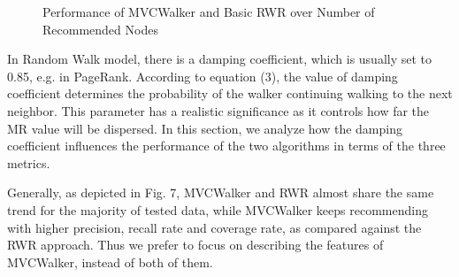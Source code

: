 \documentclass[10pt,journal,compsoc]{IEEEtran}
\begin{document}
\begin{figure}
\centering
{}
\caption{Performance of MVCWalker and Basic RWR over Number of Recommended Nodes}
\label{fig:8}       %
\end{figure}
In Random Walk model, there is a damping coefficient, which is usually set to 0.85, e.g. in PageRank. According to equation (3), the value of damping coefficient determines the probability of the walker continuing walking to the next neighbor. This parameter has a realistic significance as it controls how far the MR value will be dispersed. In this section, we analyze how the damping coefficient influences the performance of the two algorithms in terms of the three metrics.

Generally, as depicted in Fig. 7, MVCWalker and RWR almost share the same trend for the majority of tested data, while MVCWalker keeps recommending with higher precision, recall rate and coverage rate, as compared against the RWR approach. Thus we prefer to focus on describing the features of MVCWalker, instead of both of them.
\end{document}
